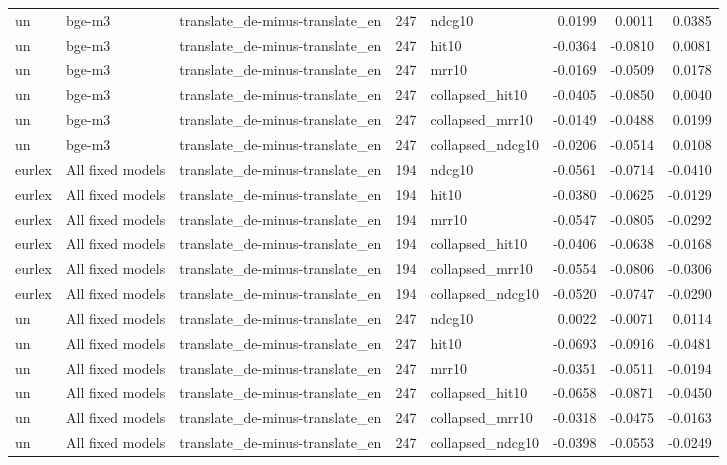 \begin{tabular}{lllrlrrr}
un & bge-m3 & translate\_de-minus-translate\_en & 247 & ndcg10 & 0.0199 & 0.0011 & 0.0385 \\
un & bge-m3 & translate\_de-minus-translate\_en & 247 & hit10 & -0.0364 & -0.0810 & 0.0081 \\
un & bge-m3 & translate\_de-minus-translate\_en & 247 & mrr10 & -0.0169 & -0.0509 & 0.0178 \\
un & bge-m3 & translate\_de-minus-translate\_en & 247 & collapsed\_hit10 & -0.0405 & -0.0850 & 0.0040 \\
un & bge-m3 & translate\_de-minus-translate\_en & 247 & collapsed\_mrr10 & -0.0149 & -0.0488 & 0.0199 \\
un & bge-m3 & translate\_de-minus-translate\_en & 247 & collapsed\_ndcg10 & -0.0206 & -0.0514 & 0.0108 \\
eurlex & All fixed models & translate\_de-minus-translate\_en & 194 & ndcg10 & -0.0561 & -0.0714 & -0.0410 \\
eurlex & All fixed models & translate\_de-minus-translate\_en & 194 & hit10 & -0.0380 & -0.0625 & -0.0129 \\
eurlex & All fixed models & translate\_de-minus-translate\_en & 194 & mrr10 & -0.0547 & -0.0805 & -0.0292 \\
eurlex & All fixed models & translate\_de-minus-translate\_en & 194 & collapsed\_hit10 & -0.0406 & -0.0638 & -0.0168 \\
eurlex & All fixed models & translate\_de-minus-translate\_en & 194 & collapsed\_mrr10 & -0.0554 & -0.0806 & -0.0306 \\
eurlex & All fixed models & translate\_de-minus-translate\_en & 194 & collapsed\_ndcg10 & -0.0520 & -0.0747 & -0.0290 \\
un & All fixed models & translate\_de-minus-translate\_en & 247 & ndcg10 & 0.0022 & -0.0071 & 0.0114 \\
un & All fixed models & translate\_de-minus-translate\_en & 247 & hit10 & -0.0693 & -0.0916 & -0.0481 \\
un & All fixed models & translate\_de-minus-translate\_en & 247 & mrr10 & -0.0351 & -0.0511 & -0.0194 \\
un & All fixed models & translate\_de-minus-translate\_en & 247 & collapsed\_hit10 & -0.0658 & -0.0871 & -0.0450 \\
un & All fixed models & translate\_de-minus-translate\_en & 247 & collapsed\_mrr10 & -0.0318 & -0.0475 & -0.0163 \\
un & All fixed models & translate\_de-minus-translate\_en & 247 & collapsed\_ndcg10 & -0.0398 & -0.0553 & -0.0249 \\

\end{tabular}
